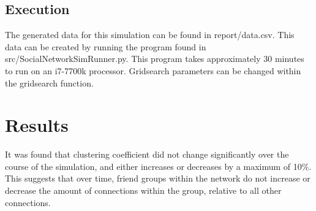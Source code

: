 \documentclass{article}
\begin{document}
\subsection{Execution}
The generated data for this simulation can be found in report/data.csv.
This data can be created by running the program found in src/SocialNetworkSimRunner.py.
This program takes approximately 30 minutes to run on an i7-7700k processor.
Gridsearch parameters can be changed within the gridsearch function.

\section{Results}

It was found that clustering coefficient did not change significantly over the
course of the simulation, and either increases or decreases by a maximum of 10\%.
This suggests that over time, friend groups within the network do not increase
or decrease the amount of connections within the group, relative to all other connections.
\end{document}
